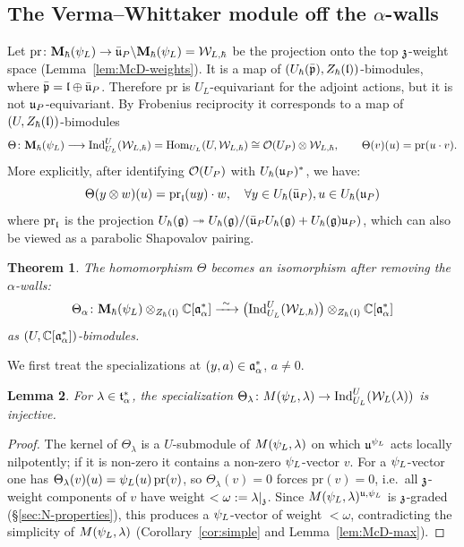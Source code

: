 \documentclass{article}
\theoremstyle{plain}
\newtheorem{theorem}{Theorem}[section]
\newtheorem{lemma}[theorem]{Lemma}
\theoremstyle{definition}
\theoremstyle{remark}
\numberwithin{equation}{section}
\begin{document}
\subsection{The Verma--Whittaker module off the \texorpdfstring{$\alpha$}{alpha}-walls}\label{sec:VW-generic}
Let $\mathrm{pr}\colon\mathbf{M}_\hbar(\psi_L)\to\bar{\mathfrak{u}}_P\backslash\mathbf{M}_\hbar(\psi_L)=\mathcal{W}_{L,\hbar}$ be the projection onto the top $\mathfrak{z}$-weight space (Lemma~\ref{lem:McD-weights}). It is a map of $(U_\hbar(\bar{\mathfrak p}),Z_\hbar(\mathfrak{l}))$-bimodules, where $\bar{\mathfrak p} =\mathfrak{l}\oplus\bar{\mathfrak{u}}_P$. Therefore $\mathrm{pr}$ is $U_L$-equivariant for the adjoint actions, but it is not $\mathfrak{u}_P$-equivariant. By Frobenius reciprocity it corresponds to a map of $(U,Z_\hbar(\mathfrak{l}))$-bimodules
\begin{equation}\label{eq:Theta}
\Theta\colon\mathbf{M}_\hbar(\psi_L)\longrightarrow\operatorname{Ind}_{U_L}^U(\mathcal{W}_{L,\hbar})=\operatorname{Hom}_{U_L}(U,\mathcal{W}_{L,\hbar})\cong\mathcal{O}(U_P)\otimes\mathcal{W}_{L,\hbar},\qquad \Theta(v)(u)=\mathrm{pr}(u\cdot v).
\end{equation}
More explicitly, after identifying $\mathcal{O}(U_P)$ with $U_\hbar(\mathfrak{u}_P)^*$, we have:
\begin{equation*}
    \Theta(y\otimes w)(u)=\mathrm{pr}_{\mathfrak{l}}(uy)\cdot w, \quad \forall y\in U_\hbar(\bar{\mathfrak{u}}_P), u\in U_\hbar(\mathfrak{u}_P)
\end{equation*}
 where $\mathrm{pr}_{\mathfrak{l}}$ is the projection $ U_\hbar(\mathfrak{g}) \twoheadrightarrow U_\hbar(\mathfrak{g}) /(\bar{\mathfrak{u}}_PU_\hbar(\mathfrak{g})+U_\hbar(\mathfrak{g})\mathfrak{u}_P)$, which can also be viewed as a parabolic Shapovalov pairing.

\begin{theorem}\label{thm:Theta}
The homomorphism $\Theta$ becomes an isomorphism after removing the $\alpha$-walls:
\[
\Theta_\alpha\colon\bM_\hbar(\psiL)\otimes_{\Zh(\frakl)}\Cal\xrightarrow{\ \sim\ }\bigl(\Ind_{U_L}^U(\calW_{L,\hbar})\bigr)\otimes_{\Zh(\frakl)}\Cal
\]
as $(U,\mathbb{C}[\mathfrak{a}^*_{\alpha}])$-bimodules.
\end{theorem}

We first treat the specializations at $(y,a)\in\mathfrak{a}^*_{\alpha}$, $a\neq0$.

\begin{lemma}\label{lem:Theta-inj}
For $\lambda\in\mathfrak{t}^*_\alpha$, the specialization $\Theta_\lambda\colon M(\psi_L,\lambda)\to\operatorname{Ind}_{U_L}^U(\mathcal{W}_L(\lambda))$ is injective.
\end{lemma}

\begin{proof}
The kernel of $\Theta_\lambda$ is a $U$-submodule of $M(\psi_L,\lambda)$ on which $\mathfrak{u}^{\psi_L}$ acts locally nilpotently; if it is non-zero it contains a non-zero $\psi_L$-vector $v$. For a $\psi_L$-vector one has $\Theta_\lambda(v)(u)=\psi_L(u)\,\mathrm{pr}(v)$, so $\Theta_\lambda(v)=0$ forces $\mathrm{pr}(v)=0$, i.e.\ all $\mathfrak{z}$-weight components of $v$ have weight $<\omega:=\lambda|_{\mathfrak{z}}$. Since $M(\psi_L,\lambda)^{\mathfrak{u},\psi_L}$ is $\mathfrak{z}$-graded (\S\ref{sec:N-properties}), this produces a $\psi_L$-vector of weight $<\omega$, contradicting the simplicity of $M(\psi_L,\lambda)$ (Corollary~\ref{cor:simple} and Lemma~\ref{lem:McD-max}).
\end{proof}
\end{document}
